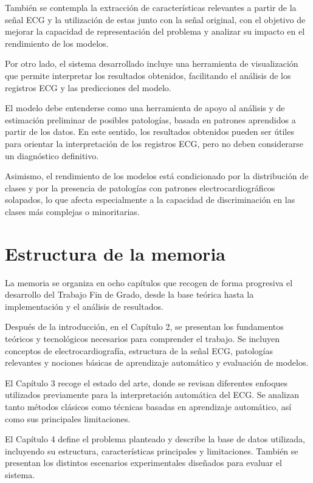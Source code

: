 \documentclass[12pt,a4paper,twoside]{book}
\begin{document}
También se contempla la extracción de características relevantes a partir de la señal ECG y la utilización de estas junto con la señal original, con el objetivo de mejorar la capacidad de representación del problema y analizar su impacto en el rendimiento de los modelos.

Por otro lado, el sistema desarrollado incluye una herramienta de visualización que permite interpretar los resultados obtenidos, facilitando el análisis de los registros ECG y las predicciones del modelo.


El modelo debe entenderse como una herramienta de apoyo al análisis y de estimación preliminar de posibles patologías, basada en patrones aprendidos a partir de los datos. 
En este sentido, los resultados obtenidos pueden ser útiles para orientar la interpretación de los registros ECG, pero no deben considerarse un diagnóstico definitivo.

Asimismo, el rendimiento de los modelos está condicionado por la distribución de clases y por la presencia de patologías con patrones electrocardiográficos solapados, lo que afecta especialmente a la capacidad de discriminación en las clases más complejas o minoritarias.

\section{Estructura de la memoria}

La memoria se organiza en ocho capítulos que recogen de forma progresiva el desarrollo del Trabajo Fin de Grado, desde la base teórica hasta la implementación y el análisis de resultados.

Después de la introducción, en el Capítulo 2, se presentan los fundamentos teóricos y tecnológicos necesarios para comprender el trabajo. 
Se incluyen conceptos de electrocardiografía, estructura de la señal ECG, patologías relevantes y nociones básicas de aprendizaje automático y evaluación de modelos.

El Capítulo 3 recoge el estado del arte, donde se revisan diferentes enfoques utilizados previamente para la interpretación automática del ECG. Se analizan tanto métodos clásicos como técnicas basadas en aprendizaje automático, así como sus principales limitaciones.

El Capítulo 4 define el problema planteado y describe la base de datos utilizada, incluyendo su estructura, características principales y limitaciones. 
También se presentan los distintos escenarios experimentales diseñados para evaluar el sistema.
\end{document}
